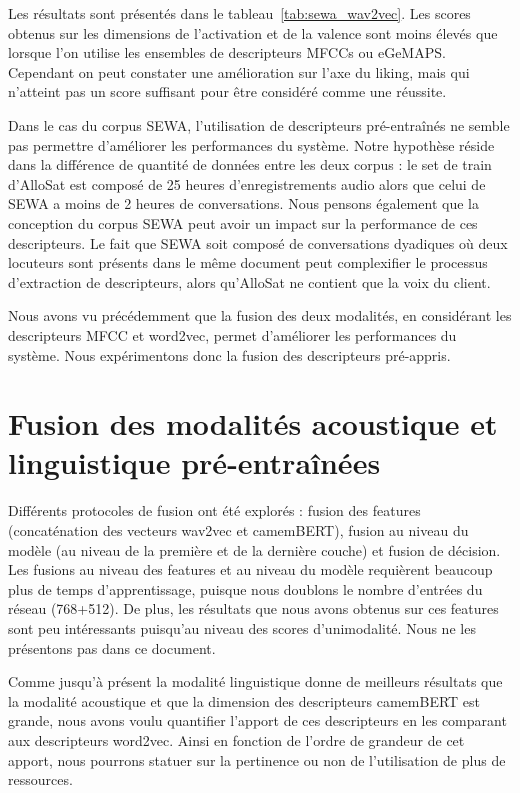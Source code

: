 

Les résultats sont présentés dans le tableau~\ref{tab:sewa_wav2vec}. Les scores obtenus sur les dimensions de l'activation et de la valence sont moins élevés que lorsque l'on utilise les ensembles de descripteurs MFCCs ou eGeMAPS. Cependant on peut constater une amélioration sur l'axe du liking, mais qui n'atteint pas un score suffisant pour être considéré comme une réussite.

Dans le cas du corpus SEWA, l'utilisation de descripteurs pré-entraînés ne semble pas permettre d'améliorer les performances du système. Notre hypothèse réside dans la différence de quantité de données entre les deux corpus : le set de train d'AlloSat est composé de 25 heures d'enregistrements audio alors que celui de SEWA a moins de 2 heures de conversations. %
Nous pensons également que la conception du corpus SEWA peut avoir un impact sur la performance de ces descripteurs. Le fait que SEWA soit composé de conversations dyadiques où deux locuteurs sont présents dans le même document peut complexifier le processus d'extraction de descripteurs, alors qu'AlloSat ne contient que la voix du client.

Nous avons vu précédemment que la fusion des deux modalités, en considérant les descripteurs MFCC et word2vec, permet d'améliorer les performances du système. Nous expérimentons donc la fusion des descripteurs pré-appris.

\section{Fusion des modalités acoustique et linguistique pré-entraînées}
Différents protocoles de fusion ont été explorés : fusion des features (concaténation des vecteurs wav2vec et camemBERT), fusion au niveau du modèle (au niveau de la première et de la dernière couche) et fusion de décision. Les fusions au niveau des features et au niveau du modèle requièrent beaucoup plus de temps d'apprentissage, puisque nous doublons le nombre d'entrées du réseau (768+512). De plus, les résultats que nous avons obtenus sur ces features sont peu intéressants puisqu'au niveau des scores d'unimodalité. Nous ne les présentons pas dans ce document.

Comme jusqu'à présent la modalité linguistique donne de meilleurs résultats que la modalité acoustique et que la dimension des descripteurs camemBERT est grande, nous avons voulu quantifier l'apport de ces descripteurs en les comparant aux descripteurs word2vec. Ainsi en fonction de l'ordre de grandeur de cet apport, nous pourrons statuer sur la pertinence ou non de l'utilisation de plus de ressources.

